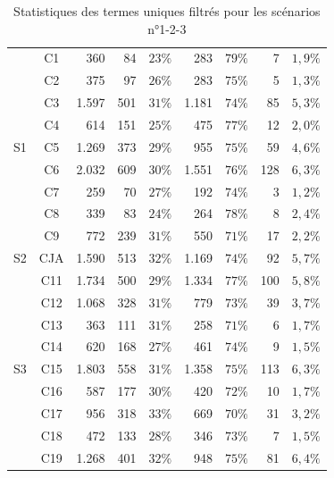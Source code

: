 \begin{table}[htb!]
{\begin{tabular}{|c| c || r || r | c || r | c || r | c |}
\hline
\multirow{9}{*}{S1} & C1 & 360	& 84 	& $ 23 \% $ & 283	& $ 79 \% $ & 7		& $ 1,9 \% $ \\ \cline{2-9}
 & C2 & 375 	& 97 	& $ 26 \% $	& 283	& $ 75 \% $ & 5		& $ 1,3 \% $ \\ \cline{2-9}
 & C3 & 1.597 	& 501 	& $ 31 \% $	& 1.181	& $ 74 \% $ & 85	& $ 5,3 \% $ \\ \cline{2-9}
 & C4 & 614 	& 151 	& $ 25 \% $	& 475 	& $ 77 \% $ & 12	& $ 2,0 \% $ \\ \cline{2-9}
 & C5 & 1.269 	& 373 	& $ 29 \% $	& 955	& $ 75 \% $ & 59	& $ 4,6 \% $ \\ \cline{2-9}
 & C6 & 2.032 	& 609 	& $ 30 \% $	& 1.551	& $ 76 \% $ & 128	& $ 6,3 \% $ \\ \cline{2-9}
 & C7 & 259 	& 70 	& $ 27 \% $	& 192	& $ 74 \% $ & 3		& $ 1,2 \% $ \\ \cline{2-9}
 & C8 & 339 	& 83 	& $ 24 \% $	& 264	& $ 78 \% $ & 8		& $ 2,4 \% $ \\ \cline{2-9}
 & C9 & 772 	& 239 	& $ 31 \% $	& 550	& $ 71 \% $ & 17	& $ 2,2 \% $ \\ \hline
\hline
\multirow{1}{*}{S2} & CJA & 1.590	& 513	& $ 32 \% $ & 1.169 	& $ 74 \% $ & 92		& $ 5,7 \% $ \\ \hline
\hline
\multirow{9}{*}{S3} & C11 & 1.734	& 500	& $ 29 \% $ & 1.334 & $ 77 \% $ & 100	& $ 5,8 \% $ \\ \cline{2-9}
 & C12 & 1.068	& 328	& $ 31 \% $ & 779 	& $ 73 \% $	& 39	& $ 3,7 \% $ \\ \cline{2-9}
 & C13 & 363 	& 111	& $ 31 \% $ & 258 	& $ 71 \% $	& 6		& $ 1,7 \% $ \\ \cline{2-9}
 & C14 & 620 	& 168 	& $ 27 \% $ & 461 	& $ 74 \% $	& 9		& $ 1,5 \% $ \\ \cline{2-9}
 & C15 & 1.803 & 558	& $ 31 \% $ & 1.358	& $ 75 \% $	& 113	& $ 6,3 \% $ \\ \cline{2-9}
 & C16 & 587 	& 177	& $ 30 \% $ & 420 	& $ 72 \% $	& 10	& $ 1,7 \% $ \\ \cline{2-9}
 & C17 & 956 	& 318	& $ 33 \% $ & 669 	& $ 70 \% $	& 31	& $ 3,2 \% $ \\ \cline{2-9}
 & C18 & 472 	& 133	& $ 28 \% $ & 346 	& $ 73 \% $	& 7		& $ 1,5 \% $ \\ \cline{2-9}
 & C19 & 1.268	& 401	& $ 32 \% $ & 948 	& $ 75 \% $	& 81	& $ 6,4 \% $ \\ \hline
\end{tabular}
}
\caption{Statistiques des termes uniques filtrés pour les scénarios n°1-2-3}
\label{table:4-cas-1-PI-StatistiquesTermesUniquesPhaseI}
\end{table}

